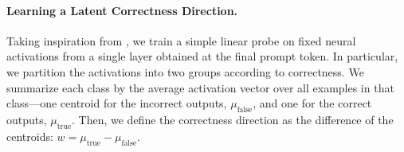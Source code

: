 \documentclass{article} %
\begin{document}
\paragraph{Learning a Latent Correctness Direction.}
\label{sec:direction}

Taking inspiration from \cite{burger2024truth}, we train a simple linear probe on fixed neural activations from a single layer obtained at the final prompt token.
In particular, we partition the activations into two groups according to correctness. 
We summarize each class by the average activation vector over all examples in that class—one centroid for the incorrect outputs, $\mu_{\text{false}}$, and one for the correct outputs, $\mu_{\text{true}}$. Then, we define the correctness direction as the difference of the centroids: $w  = \mu_{\text{true}} - \mu_{\text{false}}$. 

\end{document}
